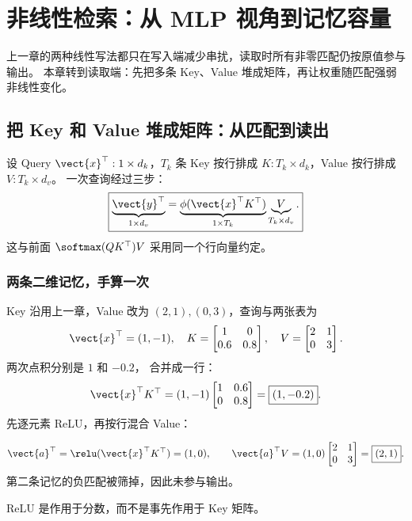 \chapterrule
\section{非线性检索：从 MLP 视角到记忆容量}
\label{intro:09-nonlinearity-and-memory}
\label{intro:13-capacity}

上一章的两种线性写法都只在写入端减少串扰，读取时所有非零匹配仍按原值参与输出。
本章转到读取端：先把多条 Key、Value 堆成矩阵，再让权重随匹配强弱非线性变化。

\subsection{把 Key 和 Value 堆成矩阵：从匹配到读出}
\label{intro:08-stacking-key-value}
设 Query $\vect{x}^\top:1\times d_k$，$T_k$ 条 Key 按行排成
$K:T_k\times d_k$，Value 按行排成 $V:T_k\times d_v$。
一次查询经过三步：
\begin{equation}
\boxed{\underbrace{\vect{y}^\top}_{1\times d_v}
=\underbrace{\phi(\vect{x}^\top K^\top)}_{1\times T_k}
\underbrace{V}_{T_k\times d_v}.}
\end{equation}
这与前面 $\softmax(QK^\top)V$ 采用同一个行向量约定。

\subsubsection{两条二维记忆，手算一次}
Key 沿用上一章，Value 改为 $(2,1),(0,3)$，查询与两张表为
\[
\vect{x}^\top=(1,-1),\quad
K=\begin{bmatrix}1&0\\0.6&0.8\end{bmatrix},\quad
V=\begin{bmatrix}2&1\\0&3\end{bmatrix}.
\]
两次点积分别是 $1$ 和 $-0.2$，
合并成一行：
\[
\vect{x}^\top K^\top=(1,-1)\begin{bmatrix}1&0.6\\0&0.8\end{bmatrix}
=\boxed{(1,-0.2)}.
\]
先逐元素 ReLU，再按行混合 Value：
\begin{example}
\[
\vect{a}^\top=\relu(\vect{x}^\top K^\top)=(1,0),\qquad
\vect{a}^\top V=(1,0)\begin{bmatrix}2&1\\0&3\end{bmatrix}
=\boxed{(2,1)}.
\]
第二条记忆的负匹配被筛掉，因此未参与输出。
\end{example}
ReLU 是作用于分数，而不是事先作用于 Key 矩阵。

